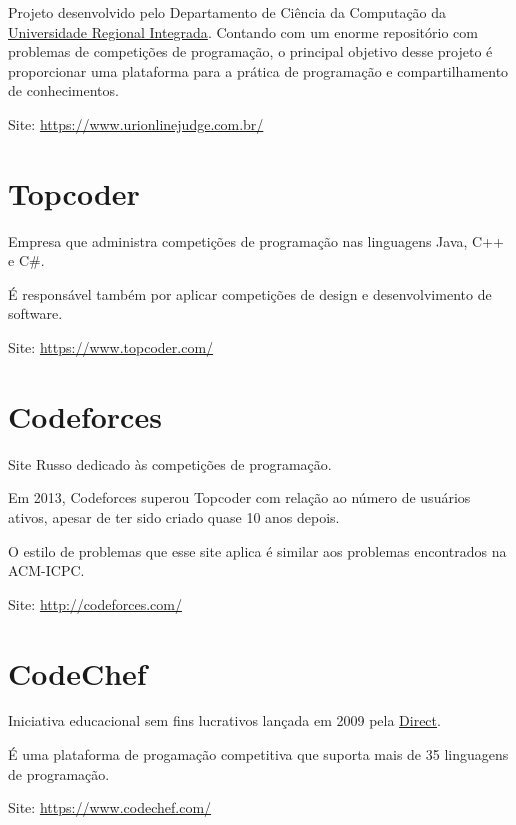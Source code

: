 Projeto desenvolvido pelo Departamento de Ciência da Computação da \href{http://www.uri.br/}{Universidade Regional Integrada}.
Contando com um enorme repositório com problemas de competições de programação, o principal objetivo desse projeto é proporcionar uma 
plataforma para a prática de programação e compartilhamento de conhecimentos.

Site: \href{https://www.urionlinejudge.com.br/}{https://www.urionlinejudge.com.br/}

\section{Topcoder} 

Empresa que administra competições de programação nas linguagens Java, C++ e C$\#$.

É responsável também por aplicar competições de design e desenvolvimento de software.

Site: \href{https://www.topcoder.com/}{https://www.topcoder.com/}

\section{Codeforces}

Site Russo dedicado às competições de programação. 

Em 2013, Codeforces superou Topcoder com relação ao número de usuários ativos, apesar de ter sido criado quase 10 anos depois.

O estilo de problemas que esse site aplica é similar aos problemas encontrados na ACM-ICPC.

Site: \href{http://codeforces.com/}{http://codeforces.com/}

\section{CodeChef}

Iniciativa educacional sem fins lucrativos lançada em 2009 pela \href{http://www.directi.com/}{Direct}.

É uma plataforma de progamação competitiva que suporta mais de 35 linguagens de programação.

Site: \href{https://www.codechef.com/}{https://www.codechef.com/}


